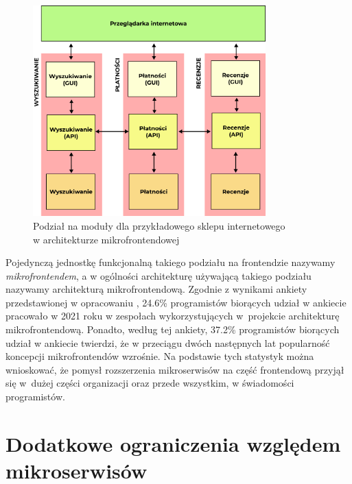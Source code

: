 \documentclass{SGGW-thesis}
\begin{document}
\begin{figure}[h]
	\centering
	\captionsetup{justification=centering}
	\includegraphics[width=0.8\textwidth]{microfrontends_diagram.png}
	\caption{Podział na moduły dla przykładowego sklepu internetowego \\ w architekturze mikrofrontendowej}
	\label{fig:microfrontends_diagram}
\end{figure}

Pojedynczą jednostkę funkcjonalną takiego podziału na frontendzie nazywamy \textit{mikrofrontendem}, a w ogólności architekturę używającą takiego podziału nazywamy architekturą mikrofrontendową.
Zgodnie z wynikami ankiety przedstawionej w opracowaniu \cite{tsh_2022}, 24.6\% programistów biorących udział w ankiecie pracowało w 2021 roku w zespołach wykorzystujących w~projekcie architekturę mikrofrontendową. Ponadto, według tej ankiety, 37.2\% programistów biorących udział w ankiecie twierdzi, że w przeciągu dwóch następnych lat popularność koncepcji mikrofrontendów wzrośnie. Na podstawie tych statystyk można wnioskować, że pomysł rozszerzenia mikroserwisów na część frontendową przyjął się w~dużej części organizacji oraz przede wszystkim, w świadomości programistów.

\section{Dodatkowe ograniczenia względem mikroserwisów}
\end{document}
